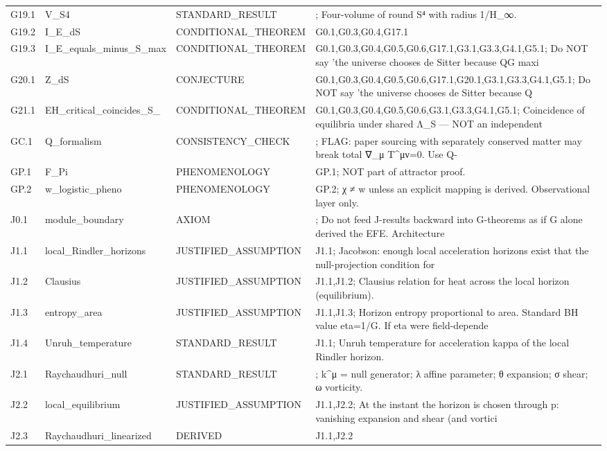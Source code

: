 \documentclass[11pt,a4paper]{article}
\theoremstyle{remark}\newtheorem*{caution}{Caution}
\begin{document}
{\begin{longtable}{@{}p{2.1cm}p{3.1cm}p{2.6cm}p{6cm}@{}}
G19.1 & V\_S4 & STANDARD\_RESULT & ; Four-volume of round S⁴ with radius 1/H\_∞. \\
G19.2 & I\_E\_dS & CONDITIONAL\_THEOREM & G0.1,G0.3,G0.4,G17.1 \\
G19.3 & I\_E\_equals\_minus\_S\_max & CONDITIONAL\_THEOREM & G0.1,G0.3,G0.4,G0.5,G0.6,G17.1,G3.1,G3.3,G4.1,G5.1; Do NOT say 'the universe chooses de Sitter because QG maxi \\
G20.1 & Z\_dS & CONJECTURE & G0.1,G0.3,G0.4,G0.5,G0.6,G17.1,G20.1,G3.1,G3.3,G4.1,G5.1; Do NOT say 'the universe chooses de Sitter because Q \\
G21.1 & EH\_critical\_coincides\_S\_ & CONDITIONAL\_THEOREM & G0.1,G0.3,G0.4,G0.5,G0.6,G3.1,G3.3,G4.1,G5.1; Coincidence of equilibria under shared Λ\_S — NOT an independent \\
GC.1 & Q\_formalism & CONSISTENCY\_CHECK & ; FLAG: paper sourcing with separately conserved matter may break total ∇\_μ T^{μν}=0. Use Q- \\
GP.1 & F\_Pi & PHENOMENOLOGY & GP.1; NOT part of attractor proof. \\
GP.2 & w\_logistic\_pheno & PHENOMENOLOGY & GP.2; χ ≠ w unless an explicit mapping is derived. Observational layer only. \\
J0.1 & module\_boundary & AXIOM & ; Do not feed J-results backward into G-theorems as if G alone derived the EFE. Architecture \\
J1.1 & local\_Rindler\_horizons & JUSTIFIED\_ASSUMPTION & J1.1; Jacobson: enough local acceleration horizons exist that the null-projection condition for  \\
J1.2 & Clausius & JUSTIFIED\_ASSUMPTION & J1.1,J1.2; Clausius relation for heat across the local horizon (equilibrium). \\
J1.3 & entropy\_area & JUSTIFIED\_ASSUMPTION & J1.1,J1.3; Horizon entropy proportional to area. Standard BH value eta=1/G. If eta were field-depende \\
J1.4 & Unruh\_temperature & STANDARD\_RESULT & J1.1; Unruh temperature for acceleration kappa of the local Rindler horizon. \\
J2.1 & Raychaudhuri\_null & STANDARD\_RESULT & ; k^μ = null generator; λ affine parameter; θ expansion; σ shear; ω vorticity. \\
J2.2 & local\_equilibrium & JUSTIFIED\_ASSUMPTION & J1.1,J2.2; At the instant the horizon is chosen through p: vanishing expansion and shear (and vortici \\
J2.3 & Raychaudhuri\_linearized & DERIVED & J1.1,J2.2 \\

\end{longtable}}
\end{document}
